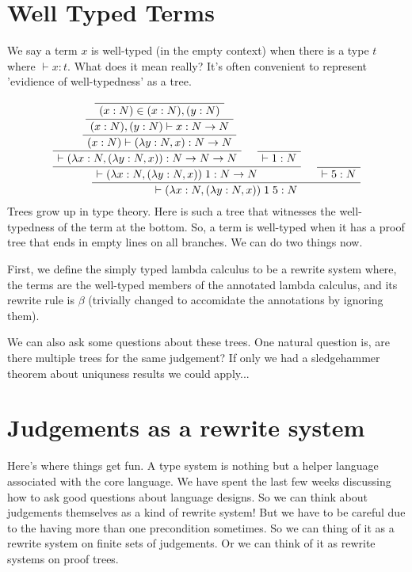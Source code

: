 \documentclass[12pt]{article}
\newenvironment{bprooftree}
  {\leavevmode\hbox\bgroup}
  {\DisplayProof\egroup}
\begin{document}
\section{Well Typed Terms}

We say a term $x$ is well-typed (in the empty context) when there is a type $t$ where $\vdash x:t$. 
What does it mean really?
It's often convenient to represent 'evidience of well-typedness' as a tree.

\[
\begin{bprooftree}
\AxiomC{}
  \AxiomC{}
  \UnaryInfC{$(x:N) \in (x:N),(y:N)$}
  \UnaryInfC{$(x:N),(y:N)\vdash x : N \rightarrow N$}
  \UnaryInfC{$(x:N)\vdash(\lambda y:N, x) : N \rightarrow N$}
\BinaryInfC{$\vdash(\lambda x:N, (\lambda y:N, x)) : N \rightarrow N \rightarrow N$}
  \AxiomC{}
  \UnaryInfC{$\vdash 1 : N$}
\BinaryInfC{$\vdash(\lambda x:N, (\lambda y:N, x))\; 1 : N \rightarrow N$}
  \AxiomC{}
  \UnaryInfC{$\vdash 5 : N$}
\BinaryInfC{$\ \vdash (\lambda x:N, (\lambda y:N, x)) \;1\; 5 : N$ }
\end{bprooftree}
\]
Trees grow up in type theory.
Here is such a tree that witnesses the well-typedness of the term at the bottom.
So, a term is well-typed when it has a proof tree that ends in empty lines on all branches. 
We can do two things now.

First, we define the simply typed lambda calculus to be a rewrite system where, the terms are the well-typed members of the annotated lambda calculus, and its rewrite rule is $\beta$ (trivially changed to accomidate the annotations by ignoring them).

We can also ask some questions about these trees.
One natural question is, are there multiple trees for the same judgement? 
If only we had a sledgehammer theorem about uniquness results we could apply...

\section{Judgements as a rewrite system}
Here's where things get fun.
A type system is nothing but a helper language associated with the core language. 
We have spent the last few weeks discussing how to ask good questions about language designs.
So we can think about judgements themselves as a kind of rewrite system!
But we have to be careful due to the having more than one precondition sometimes.
So we can thing of it as a rewrite system on finite sets of judgements.
Or we can think of it as rewrite systems on proof trees.
\end{document}
